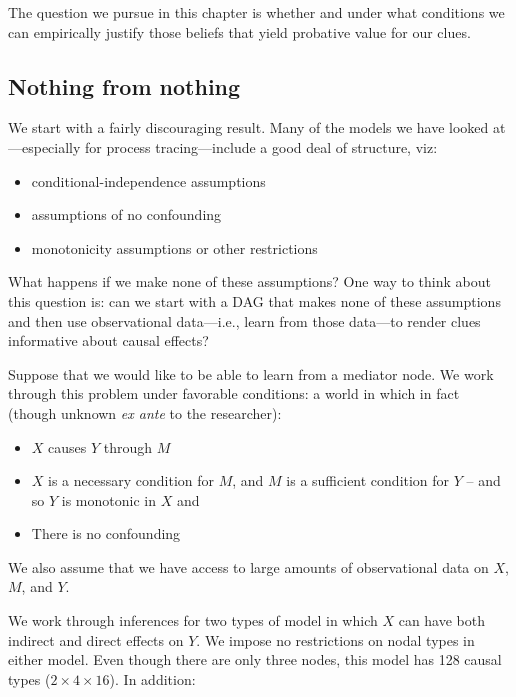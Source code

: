 \documentclass[
  12pt,
]{book}
\providecommand{\tightlist}{%
  \setlength{\itemsep}{0pt}\setlength{\parskip}{0pt}}
\begin{document}
The question we pursue in this chapter is whether and under what conditions we can empirically justify those beliefs that yield probative value for our clues.

\hypertarget{nothing-from-nothing}{%
\subsection{Nothing from nothing}\label{nothing-from-nothing}}

We start with a fairly discouraging result. Many of the models we have looked at---especially for process tracing---include a good deal of structure, viz:

\begin{itemize}
\tightlist
\item
  conditional-independence assumptions
\item
  assumptions of no confounding
\item
  monotonicity assumptions or other restrictions
\end{itemize}

What happens if we make none of these assumptions? One way to think about this question is: can we start with a DAG that makes none of these assumptions and then use observational data---i.e., learn from those data---to render clues informative about causal effects?

Suppose that we would like to be able to learn from a mediator node. We work through this problem under favorable conditions: a world in which in fact (though unknown \emph{ex ante} to the researcher):

\begin{itemize}
\tightlist
\item
  \(X\) causes \(Y\) through \(M\)
\item
  \(X\) is a necessary condition for \(M\), and \(M\) is a sufficient condition for \(Y\) -- and so \(Y\) is monotonic in \(X\) and
\item
  There is no confounding
\end{itemize}

We also assume that we have access to large amounts of observational data on \(X\), \(M\), and \(Y\).

We work through inferences for two types of model in which \(X\) can have both indirect and direct effects on \(Y\). We impose no restrictions on nodal types in either model. Even though there are only three nodes, this model has 128 causal types (\(2\times 4 \times 16\)). In addition:
\end{document}
